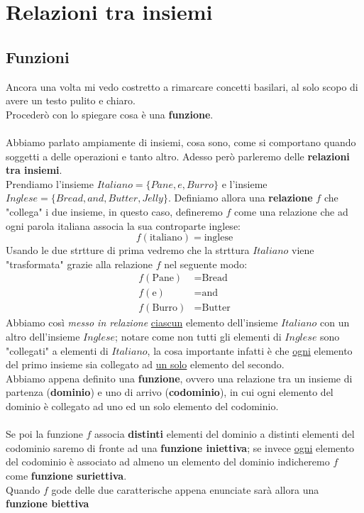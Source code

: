 \section{Relazioni tra insiemi}
\subsection{Funzioni}
Ancora una volta mi vedo costretto a rimarcare concetti basilari, al solo
scopo di avere un testo pulito e chiaro. \\
Procederò con lo spiegare cosa è una \textbf{funzione}.
\\
\\
Abbiamo parlato ampiamente di insiemi, cosa sono, come si comportano quando
soggetti a delle operazioni e tanto altro. Adesso però parleremo delle 
\textbf{relazioni tra insiemi}. \\
Prendiamo l'insieme \(Italiano = \{Pane, e, Burro\}\) e l'insieme 
\( Inglese = \{Bread, and, Butter, Jelly\}\).
Definiamo allora una \textbf{relazione} \(f\)
che "collega" i due insieme, in questo caso, defineremo \(f\) come una relazione
che ad ogni parola italiana associa la sua controparte inglese:
\[ f(\text{italiano}) = \text{inglese} \]
Usando le due strtture di prima vedremo che la strttura \(Italiano\) 
viene "trasformata" grazie alla relazione \(f\) nel seguente modo:
\begin{align*}
  f(\text{Pane}) &= \text{Bread} \\
  f(\text{e}) &= \text{and} \\
  f(\text{Burro}) &= \text{Butter}
\end{align*} 
Abbiamo così \emph{messo in relazione} \underline{ciascun}
elemento dell'insieme \(Italiano\) con un altro dell'insieme \(Inglese\); notare
come non tutti gli elementi di \(Inglese\) sono "collegati" a elementi di 
\(Italiano\), la cosa importante infatti è che \underline{ogni} elemento del primo 
insieme sia collegato ad \underline{un solo} elemento del secondo. \\
Abbiamo appena definito una \textbf{funzione}, ovvero una relazione tra un insieme
di partenza (\textbf{dominio}) e uno di arrivo (\textbf{codominio}), in cui 
ogni elemento del dominio è collegato ad uno ed un solo elemento del codominio.
\\
\\
Se poi la funzione \(f\) associa \textbf{distinti} elementi del dominio
a distinti elementi del codominio saremo di fronte ad una 
\textbf{funzione iniettiva}; se invece \underline{ogni} elemento del codominio
è associato ad almeno un elemento del dominio indicheremo \(f\) come
\textbf{funzione suriettiva}. \\
Quando \(f\) gode delle due caratterische appena enunciate sarà allora una
\textbf{funzione biettiva}

